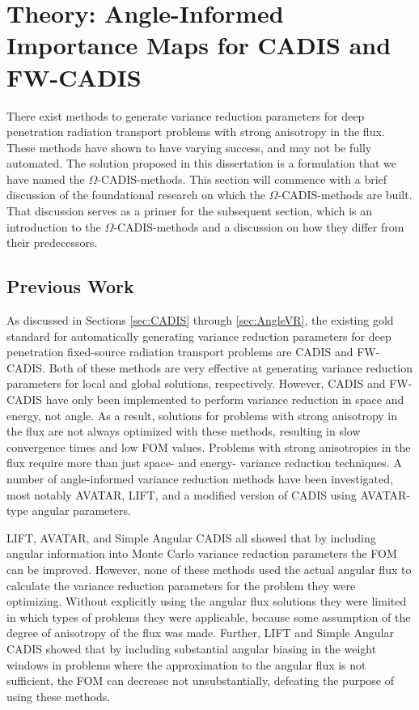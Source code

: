 \section{Theory: Angle-Informed Importance Maps for CADIS and FW-CADIS}
\label{sec:methodtheory}

There exist methods to generate
variance reduction parameters
for deep penetration radiation transport problems with strong anisotropy in the
flux. These methods have shown to have varying success, and may not be fully
automated. The solution proposed in this dissertation is a formulation that we
have named the $\Omega$-CADIS-methods. This section will commence with a brief
discussion of the foundational research
on which the $\Omega$-CADIS-methods are built.
That discussion serves as a primer for the subsequent section, which
is an introduction to the $\Omega$-CADIS-methods and a discussion on how they differ
from their predecessors.

\subsection{Previous Work}
\label{sec:omegabknd}

As discussed in Sections \ref{sec:CADIS}
through \ref{sec:AngleVR}, the existing gold standard for automatically
generating variance reduction parameters for deep penetration
fixed-source radiation transport problems are
CADIS and FW-CADIS. Both of these methods are very effective at
generating variance reduction parameters for local and global solutions,
respectively. However, CADIS and FW-CADIS have only been implemented
to perform variance reduction in
space and energy, not angle. As a result, solutions for problems with
strong anisotropy in the flux are not always optimized with these methods,
resulting in slow convergence times and low FOM values.
Problems with strong anisotropies in the flux require more than just
space- and energy- variance reduction techniques.
A number of angle-informed variance reduction methods have been
investigated, most notably AVATAR, LIFT, and a modified version of
CADIS using AVATAR-type angular parameters.

LIFT, AVATAR, and Simple Angular CADIS all showed that by including angular
information into Monte Carlo variance reduction parameters the FOM can be
improved. However, none of these methods used the actual angular flux to
calculate the variance reduction parameters for the problem they were
optimizing. Without explicitly using the angular flux solutions they were
limited in which types of problems they were applicable, because some assumption
of the degree of anisotropy of the flux was made. Further, LIFT and
Simple Angular CADIS showed that by including substantial angular biasing in the
weight windows in problems where the approximation to the angular flux is not
sufficient, the FOM can decrease not unsubstantially, defeating the purpose of using
these methods.

